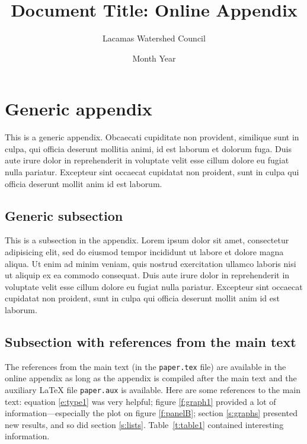 \documentclass[letterpaper,11pt,leqno]{article}
\begin{document}
\title{Document Title: Online Appendix}

\author{Lacamas Watershed Council}

\date{Month Year}


\begin{titlepage}
\maketitle
\tableofcontents
\end{titlepage}

\section{Generic appendix}\label{a:appendix1}

This is a generic appendix. Obcaecati cupiditate non provident, similique sunt in culpa, qui officia deserunt mollitia animi, id est laborum et dolorum fuga. Duis aute irure dolor in reprehenderit in voluptate velit esse cillum dolore eu fugiat nulla pariatur. Excepteur sint occaecat cupidatat non proident, sunt in culpa qui officia deserunt mollit anim id est laborum. 

\subsection{Generic subsection} 

This is a subsection in the appendix. Lorem ipsum dolor sit amet, consectetur adipisicing elit, sed do eiusmod tempor incididunt ut labore et dolore magna aliqua. Ut enim ad minim veniam, quis nostrud exercitation ullamco laboris nisi ut aliquip ex ea commodo
consequat. Duis aute irure dolor in reprehenderit in voluptate velit esse
cillum dolore eu fugiat nulla pariatur. Excepteur sint occaecat cupidatat non
proident, sunt in culpa qui officia deserunt mollit anim id est laborum. 

\subsection{Subsection with references from the main text} 

The references from the main text (in the \texttt{paper.tex} file) are available in the online appendix as long as the appendix is compiled after the main text and the auxiliary LaTeX file \texttt{paper.aux} is available. Here are some references to the main text: equation \ref{e:type1} was very helpful; figure \ref{f:graph1} provided a lot of information---especially the plot on figure \ref{f:panelB}; section \ref{s:graphs} presented new results, and so did section \ref{s:lists}. Table~\ref{t:table1} contained interesting information.
\end{document}

